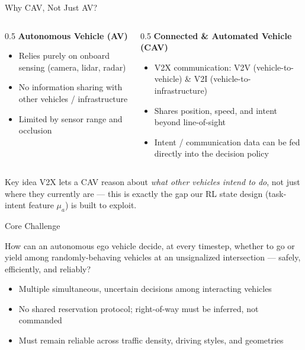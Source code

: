 \documentclass[aspectratio=169,10pt]{beamer}
\begin{document}
\begin{frame}{Why CAV, Not Just AV?}
    \begin{columns}[T]
        \begin{column}{0.5\textwidth}
            \textbf{Autonomous Vehicle (AV)}
            \begin{itemize}
                \item Relies purely on onboard sensing (camera, lidar, radar)
                \item No information sharing with other vehicles / infrastructure
                \item Limited by sensor range and occlusion
            \end{itemize}
        \end{column}
        \begin{column}{0.5\textwidth}
            \textbf{Connected \& Automated Vehicle (CAV)}
            \begin{itemize}
                \item V2X communication: V2V (vehicle-to-vehicle) \& V2I (vehicle-to-infrastructure)
                \item Shares position, speed, and \alert{intent} beyond line-of-sight
                \item Intent / communication data can be fed directly into the decision policy
            \end{itemize}
        \end{column}
    \end{columns}
    \vspace{8pt}
    \begin{alertblock}{Key idea}
        V2X lets a CAV reason about \emph{what other vehicles intend to do}, not just where they currently are — this is exactly the gap our RL state design (task-intent feature $\mu_a$) is built to exploit.
    \end{alertblock}
\end{frame}


\begin{frame}{Core Challenge}
    \begin{center}
        \Large How can an autonomous ego vehicle decide, at every timestep, whether to \alert{go} or \alert{yield} among randomly-behaving vehicles at an unsignalized intersection --- safely, efficiently, and reliably?
    \end{center}
    \vspace{10pt}
    \begin{itemize}
        \item Multiple simultaneous, uncertain decisions among interacting vehicles
        \item No shared reservation protocol; right-of-way must be inferred, not commanded
        \item Must remain reliable across traffic density, driving styles, and geometries
    \end{itemize}
\end{frame}
\end{document}
